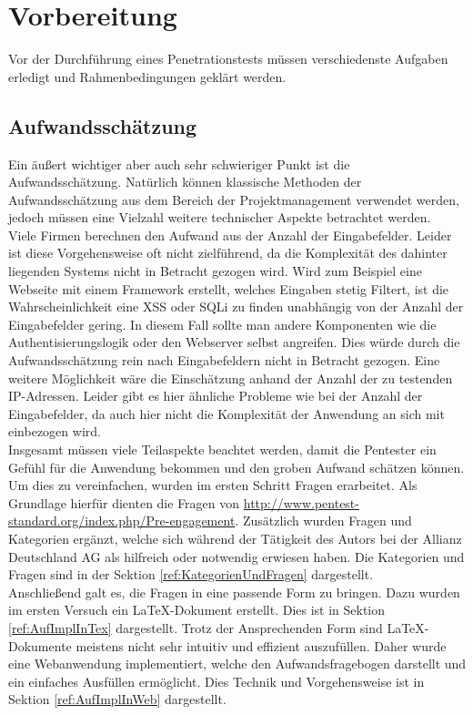 \section{Vorbereitung}
Vor der Durchführung eines Penetrationstests müssen verschiedenste Aufgaben erledigt und Rahmenbedingungen geklärt werden.

\subsection{Aufwandsschätzung}
	Ein äußert wichtiger aber auch sehr schwieriger Punkt ist die Aufwandsschätzung. Natürlich können klassische Methoden der Aufwandsschätzung aus dem Bereich der Projektmanagement verwendet werden, jedoch müssen eine Vielzahl weitere technischer Aspekte betrachtet werden.\\
	
	Viele Firmen berechnen den Aufwand aus der Anzahl der Eingabefelder. Leider ist diese Vorgehensweise oft nicht zielführend, da die Komplexität des dahinter liegenden Systems nicht in Betracht gezogen wird. Wird zum Beispiel eine Webseite mit einem Framework erstellt, welches Eingaben stetig Filtert, ist die Wahrscheinlichkeit eine XSS oder SQLi zu finden unabhängig von der Anzahl der Eingabefelder gering. In diesem Fall sollte man andere Komponenten wie die Authentisierungslogik oder den Webserver selbst angreifen. Dies würde durch die Aufwandsschätzung rein nach Eingabefeldern nicht in Betracht gezogen. Eine weitere Möglichkeit wäre die Einschätzung anhand der Anzahl der zu testenden IP-Adressen. Leider gibt es hier ähnliche Probleme wie bei der Anzahl der Eingabefelder, da auch hier nicht die Komplexität der Anwendung an sich mit einbezogen wird.\\

Insgesamt müssen viele Teilaspekte beachtet werden, damit die Pentester ein Gefühl für die Anwendung bekommen und den groben Aufwand schätzen können. Um dies zu vereinfachen, wurden im ersten Schritt Fragen erarbeitet. Als Grundlage hierfür dienten die Fragen von \url{http://www.pentest-standard.org/index.php/Pre-engagement}. Zusätzlich wurden Fragen und Kategorien ergänzt, welche sich während der Tätigkeit des Autors bei der Allianz Deutschland AG als hilfreich oder notwendig erwiesen haben. Die Kategorien und Fragen sind in der Sektion \ref{ref:KategorienUndFragen} dargestellt.\\

Anschließend galt es, die Fragen in eine passende Form zu bringen. Dazu wurden im ersten Versuch ein LaTeX-Dokument erstellt. Dies ist in Sektion \ref{ref:AufImplInTex} dargestellt. Trotz der Ansprechenden Form sind LaTeX-Dokumente meistens nicht sehr intuitiv und effizient auszufüllen. Daher wurde eine Webanwendung implementiert, welche den Aufwandsfragebogen darstellt und ein einfaches Ausfüllen ermöglicht. Dies Technik und Vorgehensweise ist in Sektion \ref{ref:AufImplInWeb} dargestellt.

